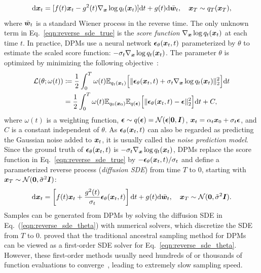 \begin{equation}
\label{eqn:reverse_sde_true}
    \mathrm{d}\bm{x}_t = [f(t)\bm{x}_t - g^2(t) \nabla_{\bm{x}}\log q_t(\bm{x}_t)] \mathrm{d}t + g(t) \dd \bar{\bm{w}}_t, \quad \bm{x}_T\sim q_T(\bm{x}_T),
\end{equation}
where $\bar{\bm{w}}_t$ is a standard Wiener process in the reverse time. The only unknown term in Eq.~\eqref{eqn:reverse_sde_true} is the \textit{score function} $\nabla_{\bm{x}}\log q_t(\bm{x}_t)$ at each time $t$. In practice, DPMs use a neural network $\bm{\epsilon}_\theta(\bm{x}_t,t)$ parameterized by $\theta$ to estimate the scaled score function: $-\sigma_t\nabla_{\bm{x}}\log q_t(\bm{x}_t)$. The parameter $\theta$ is optimized by minimizing the following objective~\citep{ho2020denoising, song2020score}:
\begin{align}
    \mathcal L(\theta;\omega(t))&\coloneqq \frac{1}{2}\int_0^T \omega(t) \mathbb{E}_{q_t(\bm{x}_t)}\Big[\|\bm{\epsilon}_\theta(\bm{x}_t,t)+\sigma_t\nabla_{\bm{x}}\log q_t(\bm{x}_t)\|_2^2\Big]\mathrm{d}t \nonumber \\
    &= \frac{1}{2}\int_0^T \omega(t) \mathbb{E}_{q_0(\bm{x}_0)}\mathbb{E}_{q(\bm{\epsilon})}\Big[\|\bm{\epsilon}_\theta(\bm{x}_t,t)-\bm{\epsilon}\|_2^2\Big]\mathrm{d}t + C, \nonumber
\end{align}
where $\omega(t)$ is a weighting function, $\bm{\epsilon}\sim q(\bm{\epsilon})=\mathcal{N}(\bm{\epsilon}|\bm{0},\bm{I})$, $\bm{x}_t=\alpha_t\bm{x}_0+\sigma_t\bm{\epsilon}$, and $C$ is a constant independent of $\theta$. As $\bm{\epsilon}_\theta(\bm{x}_t,t)$ can also be regarded as predicting the Gaussian noise added to $\bm{x}_t$, it is usually called the \textit{noise prediction model}. 
Since the ground truth of $\bm{\epsilon}_\theta(\bm{x}_t,t)$ is $-\sigma_t\nabla_{\bm{x}}\log q_t(\bm{x}_t)$, DPMs replace the score function in Eq.~\eqref{eqn:reverse_sde_true} by $-\bm{\epsilon}_\theta(\bm{x}_t,t) / \sigma_t$ and define a parameterized reverse process (\textit{diffusion SDE}) from time $T$ to $0$, starting with $\bm{x}_T\sim \mathcal{N}(\bm{0},\tilde\sigma^2\bm{I})$:
\begin{equation}
\label{eqn:reverse_sde_theta}
    \mathrm{d}\bm{x}_t = \left [f(t)\bm{x}_t + \frac{g^2(t)}{\sigma_t} \bm{\epsilon}_\theta(\bm{x}_t,t)\right] \mathrm{d}t + g(t) \dd \bar{\bm{w}}_t, \quad \bm{x}_T\sim \mathcal{N}(\bm{0},\tilde\sigma^2\bm{I}).
\end{equation}
Samples can be generated from DPMs by solving the diffusion SDE in Eq.~(\ref{eqn:reverse_sde_theta}) with numerical solvers, which discretize the SDE from $T$ to $0$. \citet{song2020score} proved that the traditional ancestral sampling method for DPMs~\citep{ho2020denoising} can be viewed as a first-order SDE solver for Eq.~\eqref{eqn:reverse_sde_theta}. However, these first-order methods usually need hundreds of or thousands of function evaluations to converge~\citep{song2020score}, leading to extremely slow sampling speed.


